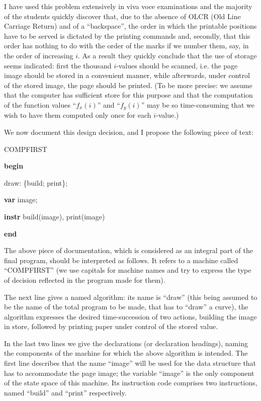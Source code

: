 I have used this problem extensively in viva voce examinations and the majority of the students quickly discover that, due to the absence of OLCR (Old Line Carriage Return) and of a ``backspace'', the order in which the printable positions have to be served is dictated by the printing commands and, secondly, that this order has nothing to do with the order of the marks if we number them, say, in the order of increasing $i$. As a result they quickly conclude that the use of storage seems indicated: first the thousand $i$-values should be scanned, i.e. the page image should be stored in a convenient manner, while afterwards, under control of the stored image, the page should be printed. (To be more precise: we assume that the computer has sufficient store for this purpose and that the computation of the function values ``$f_x(i)$'' and ``$f_y(i)$'' may be so time-consuming that we wish to have them computed only once for each $i$-value.)

We now document this design decision, and I propose the following piece of text:

COMPFIRST

\textbf{begin}

\quad draw: \{build; print\};

\quad\textbf{var} image;

\quad\textbf{instr} build(image), print(image)

\textbf{end}

The above piece of documentation, which is considered as an integral part of the final program, should be interpreted as follows. It refers to a machine called ``COMPFIRST'' (we use capitals for machine names and try to express the type of decision reflected in the program made for them).

The next line gives a named algorithm: its name is ``draw'' (this being assumed to be the name of the total program to be made, that has to ``draw'' a curve), the algorithm expresses the desired time-succession of two actions, building the image in store, followed by printing paper under control of the stored value.

In the last two lines we give the declarations (or declaration headings), naming the components of the machine for which the above algorithm is intended. The first line describes that the name ``image'' will be used for the data structure that has to accommodate the page image; the variable ``image'' is the only component of the state space of this machine. Its instruction code comprises two instructions, named ``build'' and ``print'' respectively.

